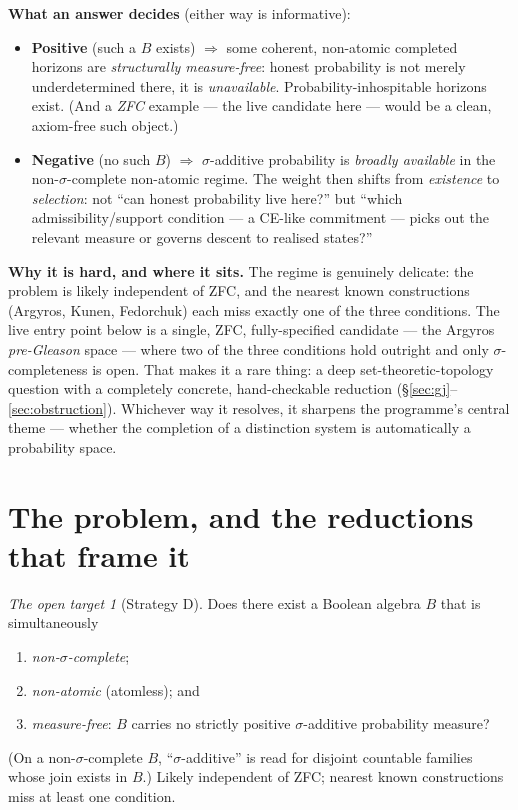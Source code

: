 \documentclass[11pt]{article}
\theoremstyle{definition}
\theoremstyle{remark}
\newtheorem*{target}{The open target}
\begin{document}
\medskip
\noindent\textbf{What an answer decides} (either way is informative):
\begin{itemize}[nosep]
  \item \textbf{Positive} (such a $B$ exists) $\Rightarrow$ some coherent,
    non-atomic completed horizons are \emph{structurally measure-free}: honest
    probability is not merely underdetermined there, it is \emph{unavailable}.
    Probability-inhospitable horizons exist. (And a \emph{ZFC} example --- the live
    candidate here --- would be a clean, axiom-free such object.)
  \item \textbf{Negative} (no such $B$) $\Rightarrow$ $\sigma$-additive probability
    is \emph{broadly available} in the non-$\sigma$-complete non-atomic regime. The
    weight then shifts from \emph{existence} to \emph{selection}: not ``can honest
    probability live here?'' but ``which admissibility/support condition --- a
    CE-like commitment --- picks out the relevant measure or governs descent to
    realised states?''
\end{itemize}

\medskip
\noindent\textbf{Why it is hard, and where it sits.} The regime is genuinely
delicate: the problem is likely independent of ZFC, and the nearest known
constructions (Argyros, Kunen, Fedorchuk) each miss exactly one of the three
conditions. The live entry point below is a single, ZFC, fully-specified candidate
--- the Argyros \emph{pre-Gleason} space --- where two of the three conditions hold
outright and only $\sigma$-completeness is open. That makes it a rare thing: a
deep set-theoretic-topology question with a completely concrete, hand-checkable
reduction (\S\ref{sec:gj}--\ref{sec:obstruction}). Whichever way it resolves, it
sharpens the programme's central theme --- whether the completion of a distinction
system is automatically a probability space.

\section{The problem, and the reductions that frame it}\label{sec:problem}

\begin{target}[Strategy D]
Does there exist a Boolean algebra $B$ that is simultaneously
\begin{enumerate}[label=\textup{(\roman*)},nosep]
  \item \emph{non-$\sigma$-complete};
  \item \emph{non-atomic} (atomless); and
  \item \emph{measure-free}: $B$ carries no strictly positive $\sigma$-additive
    probability measure?
\end{enumerate}
(On a non-$\sigma$-complete $B$, ``$\sigma$-additive'' is read for disjoint countable
families whose join exists in $B$.) Likely independent of ZFC; nearest known
constructions miss at least one condition.
\end{target}
\end{document}
